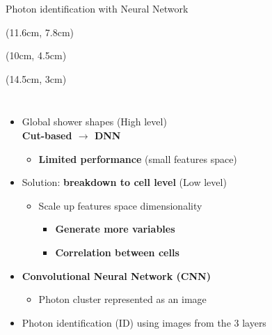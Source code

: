 \begin{frame}{Photon identification with Neural Network}
\begin{textblock*}{5cm}(11.6cm, 7.8cm) %
\end{textblock*}
\begin{textblock*}{5cm}(10cm, 4.5cm)
\end{textblock*}
\begin{textblock*}{5cm}(14.5cm, 3cm) %
\end{textblock*}
\begin{columns}
\begin{itemize}
    \item Global shower shapes (High level) \\
    \textbf{Cut-based $\to$ DNN}
    \begin{itemize}
        \item \textcolor{HHred}{\textbf{Limited performance}} (small features space)
    \end{itemize}
    \pause
    \item Solution: \textbf{\textcolor{HHturquoise_d}{breakdown to cell level}} (Low level)
    \begin{itemize}
        \item Scale up features space dimensionality
        \begin{itemize}
            \item \textbf{Generate more variables}
            \item \textbf{Correlation between cells}
        \end{itemize} 
    \end{itemize}
    \pause
    \item \textcolor{structurColor}{\textbf{Convolutional Neural Network (CNN)}}
    \begin{itemize}
        \item Photon cluster represented as an image
    \end{itemize}
    \item Photon identification (ID) using images from the 3 layers 
\end{itemize}    


\end{columns}
\end{frame}
